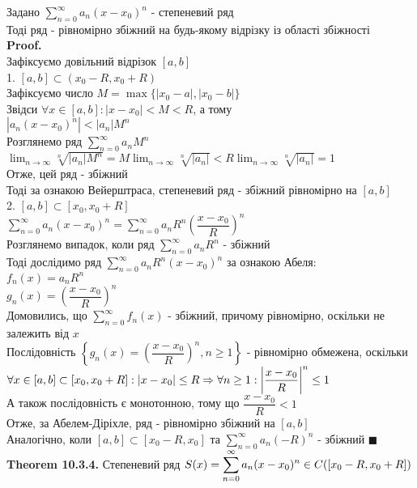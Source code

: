 \documentclass[a4paper, 14pt]{extarticle}
\def\huge{\displaystyle}
\def\bigline{\vspace{5mm}\\}
\def\th#1{\textbf{Theorem {#1}}}
\def\proof{\textbf{Proof.}\\}
\def\bigline{\vspace{5mm}\\}
\def\qed{$\blacksquare$}
\begin{document}
Задано $\huge \sum_{n=0}^\infty a_n(x-x_0)^n$ - степеневий ряд\\
Тоді ряд - рівномірно збіжний на будь-якому відрізку із області збіжності\\
\proof
Зафіксуємо довільний відрізок $[a,b]$\\
1. $[a,b] \subset (x_0-R,x_0+R)$\\
Зафіксуємо число $M = \max\{|x_0-a|,|x_0-b|\}$\\
Звідси $\forall x \in [a,b]: |x-x_0| < M < R$, а тому\\
$|a_n(x-x_0)^n| < |a_n| M^n$\\
Розглянемо ряд $\huge \sum_{n=0}^\infty a_n M^n$\\
$\huge \lim_{n \to \infty} \sqrt[n]{|a_n| M^n} = M \lim_{n \to \infty} \sqrt[n]{|a_n|} < R \lim_{n \to \infty} \sqrt[n]{|a_n|} = 1$\\
Отже, цей ряд - збіжний\\
Тоді за ознакою Вейерштраса, степеневий ряд - збіжний рівномірно на $[a,b]$
\bigline
2. $[a,b] \subset [x_0,x_0+R]$\\
$\huge \sum_{n=0}^\infty a_n(x-x_0)^n = \sum_{n=0}^\infty a_n R^n \left( \dfrac{x-x_0}{R} \right)^n$\\
Розглянемо випадок, коли ряд $\huge \sum_{n=0}^\infty a_n R^n$ - збіжний\\
Тоді дослідимо ряд $\huge \sum_{n=0}^\infty a_n R^n (x-x_0)^n$ за ознакою Абеля:\\
$f_n(x) = a_n R^n$\\
$g_n(x) = \left( \dfrac{x-x_0}{R} \right)^n$\\
Домовились, що $\huge \sum_{n=0}^\infty f_n(x)$ - збіжний, причому рівномірно, оскільки не залежить від $x$\\
Послідовність $\left\{ g_n(x) = \left( \dfrac{x-x_0}{R} \right)^n, n \geq 1 \right\}$ - рівномірно обмежена, оскільки\\
$\forall x \in [a,b] \subset [x_0, x_0+R]: |x - x_0| \leq R \Rightarrow \forall n \geq 1: \abs{\dfrac{x-x_0}{R}}^n \leq 1$\\
А також послідовність є монотонною, тому що $\dfrac{x-x_0}{R} < 1$\\
Отже, за Абелем-Діріхле, ряд - рівномірно збіжний на $[a,b]$
\bigline
Аналогічно, коли $[a,b] \subset [x_0-R, x_0]$ та $\huge \sum_{n=0}^\infty a_n (-R)^n$ - збіжний \qed
\bigline
\th{10.3.4.} Степеневий ряд $\huge S(x) = \sum_{n=0}^\infty a_n(x-x_0)^n \\ \in C([x_0-R,x_0+R])$\\
\end{document}
